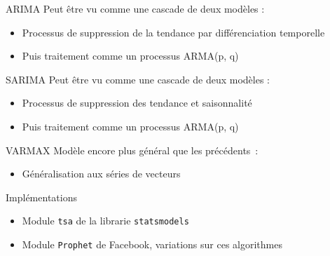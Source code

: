 \begin{frame}{ARIMA}
  Peut être vu comme une cascade de deux modèles :

  \begin{itemize}[<+->]
    \item Processus de suppression de la tendance par différenciation temporelle
    \item Puis traitement comme un processus ARMA(p, q)
  \end{itemize}
\end{frame}

\begin{frame}{SARIMA}
  Peut être vu comme une cascade de deux modèles :

  \begin{itemize}[<+->]
    \item Processus de suppression des tendance et saisonnalité
    \item Puis traitement comme un processus ARMA(p, q)
  \end{itemize}
\end{frame}

\begin{frame}{VARMAX}
  Modèle encore plus général que les précédents~:

  \begin{itemize}
  \item Généralisation aux séries de vecteurs
  \end{itemize}
\end{frame}

\begin{frame}{Implémentations}
  \begin{itemize}[<+->]
    \item Module \texttt{tsa} de la librarie \texttt{statsmodels}
    \item Module \texttt{Prophet} de Facebook, variations sur ces algorithmes
  \end{itemize}
\end{frame}
